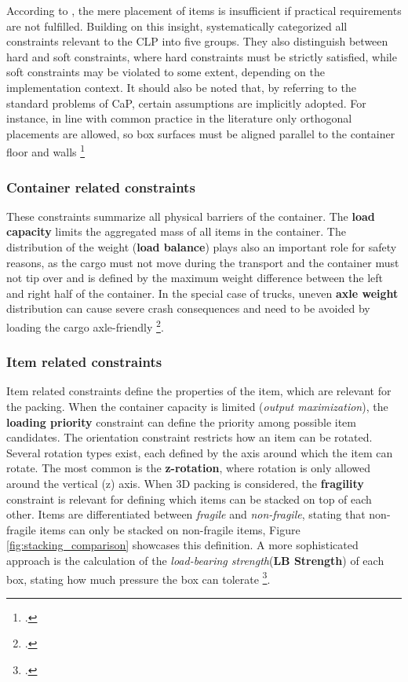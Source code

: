 According to \cite{bischoff_issues_1995}, the mere placement of items is insufficient
if practical requirements are not fulfilled. Building on this insight,
\cite{bortfeldt_constraints_2013} systematically categorized all constraints relevant
to the \gls{CLP} into five groups. They also distinguish between hard and soft constraints,
where hard constraints must be strictly satisfied, while soft constraints may be violated
to some extent, depending on the implementation context.
It should also be noted that, by referring to the standard problems of \gls{CaP},
certain assumptions are implicitly adopted. For instance, in line with common
practice in the literature only orthogonal placements are allowed, so box surfaces must be
aligned parallel to the container floor and walls \footcite[cf.][p.2]{bortfeldt_constraints_2013}

\subsubsection{Container related constraints}
These constraints summarize all physical barriers of the container. The \textbf{load capacity} limits the aggregated
mass of all items in the container. The distribution of the weight (\textbf{load balance})
plays also an important role for safety reasons, as the cargo must not move during the transport and the container
must not tip over and is defined by the maximum weight difference between the left and right half of the container.
In the special case of trucks, uneven \textbf{axle weight} distribution can cause severe
crash consequences and need to be avoided by loading the cargo axle-friendly \footcite[cf.][pp. 849--850]{krebs_advanced_2021}.

\subsubsection{Item related constraints}
Item related constraints define the properties of the item, which are relevant
for the packing. When the container capacity is limited (\textit{output maximization}),
the \textbf{loading priority} constraint can define the priority among possible
item candidates. The orientation constraint restricts how an item can be rotated.
Several rotation types exist, each defined by the axis around which the item can rotate.
The most common is the \textbf{z-rotation}, where rotation is only allowed around the vertical (z) axis.
When 3D packing is considered, the \textbf{fragility} constraint
is relevant for defining which items can be stacked on top of each other. Items are
differentiated between \textit{fragile} and \textit{non-fragile}, stating
that non-fragile items can only be stacked on non-fragile items, Figure \ref{fig:stacking_comparison} showcases
this definition. A more sophisticated approach is the calculation of the
\textit{load-bearing strength}(\textbf{LB Strength}) of each box, stating how much pressure the box
can tolerate \footcite[cf.][pp. 847--848]{krebs_advanced_2021}.

